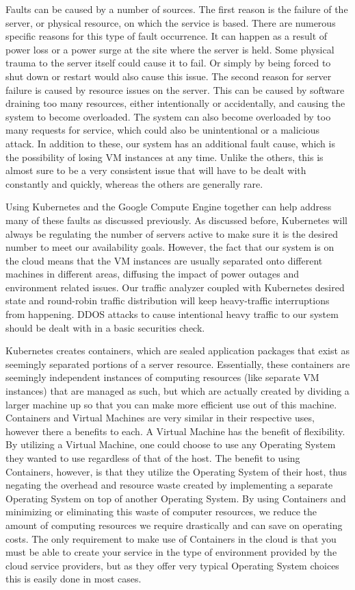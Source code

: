 \documentclass[thesis,proposal]{umassthesis}  %
\begin{document}
	Faults can be caused by a number of sources. The first reason is the failure of the server, or physical resource, on which the service is based. There are numerous specific reasons for this type of fault occurrence. It can happen as a result of power loss or a power surge at the site where the server is held. Some physical trauma to the server itself could cause it to fail. Or simply by being forced to shut down or restart would also cause this issue. The second reason for server failure is caused by resource issues on the server. This can be caused by software draining too many resources, either intentionally or accidentally, and causing the system to become overloaded. The system can also become overloaded by too many requests for service, which could also be unintentional or a malicious attack. In addition to these, our system has an additional fault cause, which is the possibility of losing VM instances at any time. Unlike the others, this is almost sure to be a very consistent issue that will have to be dealt with constantly and quickly, whereas the others are generally rare.\par
	Using Kubernetes and the Google Compute Engine together can help address many of these faults as discussed previously. As discussed before, Kubernetes will always be regulating the number of servers active to make sure it is the desired number to meet our availability goals. However, the fact that our system is on the cloud means that the VM instances are usually separated onto different machines in different areas, diffusing the impact of power outages and environment related issues. Our traffic analyzer coupled with Kubernetes desired state and round-robin traffic distribution will keep heavy-traffic interruptions from happening. DDOS attacks to cause intentional heavy traffic to our system should be dealt with in a basic securities check.\par
Kubernetes creates containers, which are sealed application packages that exist as seemingly separated portions of a server resource. Essentially, these containers are seemingly independent instances of computing resources (like separate VM instances) that are managed as such, but which are actually created by dividing a larger machine up so that you can make more efficient use out of this machine. Containers and Virtual Machines are very similar in their respective uses, however there a benefits to each. A Virtual Machine has the benefit of flexibility. By utilizing a Virtual Machine, one could choose to use any Operating System they wanted to use regardless of that of the host. The benefit to using Containers, however, is that they utilize the Operating System of their host, thus negating the overhead and resource waste created by implementing a separate Operating System on top of another Operating System. By using Containers and minimizing or eliminating this waste of computer resources, we reduce the amount of computing resources we require drastically and can save on operating costs. The only requirement to make use of Containers in the cloud is that you must be able to create your service in the type of environment provided by the cloud service providers, but as they offer very typical Operating System choices this is easily done in most cases.\par
\end{document}
